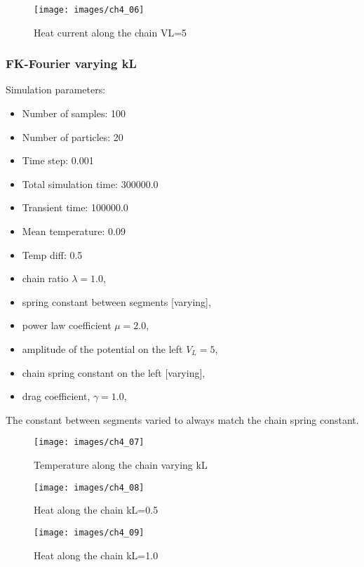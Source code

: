 \begin{figure}[H]
	\centering
	\texttt{[image: images/ch4\_06]}
	\caption{Heat current along the chain VL=5}
	\label{fig:ch4_06}
\end{figure}

\subsubsection{FK-Fourier varying kL}
Simulation parameters:
\begin{itemize}
	\item Number of samples: 100
	\item Number of particles: 20
	\item Time step: 0.001
	\item Total simulation time: 300000.0
	\item Transient time: 100000.0
	\item Mean temperature: 0.09
	\item Temp diff: 0.5
	\item chain ratio $ \lambda=1.0 $,
	\item spring constant between segments [varying],
	\item power law coefficient $ \mu=2.0 $,
	\item amplitude of the potential on the left $ V_{L}=5 $,
	\item chain spring constant on the left [varying],
	\item drag coefficient, $ \gamma=1.0 $,
\end{itemize}

The constant between segments varied to always match the chain spring constant.

\begin{figure}[H]
	\centering
	\texttt{[image: images/ch4\_07]}
	\caption{Temperature along the chain varying kL}
	\label{fig:ch4_07}
\end{figure}

\begin{figure}[H]
	\centering
	\texttt{[image: images/ch4\_08]}
	\caption{Heat along the chain kL=0.5}
	\label{fig:ch4_08}
\end{figure}

\begin{figure}[H]
	\centering
	\texttt{[image: images/ch4\_09]}
	\caption{Heat along the chain kL=1.0}
	\label{fig:ch4_09}
\end{figure}

